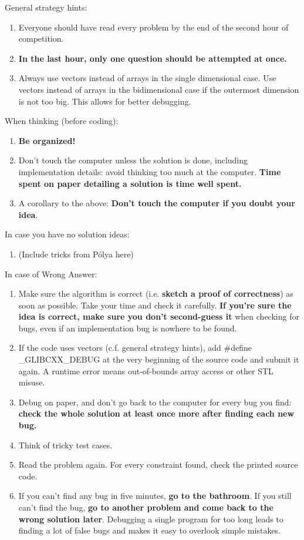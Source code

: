       General strategy hints:
      \begin{enumerate}
        \item Everyone should have read every problem by the end of the second hour of competition.
        \item \textbf{In the last hour, only one question should be attempted at once.}
        \item Always use vectors instead of arrays in the single dimensional case. Use vectors instead of arrays in the bidimensional case if the outermost dimension is not too big. This allows for better debugging.
      \end{enumerate}

      When thinking (before coding):
      \begin{enumerate}
        \item \textbf{Be organized!}
        \item Don't touch the computer unless the solution is done, including implementation details: avoid thinking too much at the computer. \textbf{Time spent on paper detailing a solution is time well spent.}
        \item A corollary to the above: \textbf{Don't touch the computer if you doubt your idea}.
      \end{enumerate}

      In case you have no solution ideas:
      \begin{enumerate}
        \item (Include tricks from Pólya here)
      \end{enumerate}

      In case of Wrong Answer:
      \begin{enumerate}
        \item Make sure the algorithm is correct (i.e. \textbf{sketch a proof of correctness}) as soon as possible. Take your time and check it carefully. \textbf{If you're sure the idea is correct, make sure you don't second-guess it} when checking for bugs, even if an implementation bug is nowhere to be found.
        \item If the code uses vectors (c.f. general strategy hints), add \#define \_GLIBCXX\_DEBUG at the very beginning of the source code and submit it again. A runtime error means out-of-bounds array access or other STL misuse.
        \item Debug on paper, and don't go back to the computer for every bug you find: \textbf{check the whole solution at least once more after finding each new bug.}
        \item Think of tricky test cases.
        \item Read the problem again. For every constraint found, check the printed source code.
        \item If you can't find any bug in five minutes, \textbf{go to the bathroom}. If you still can't find the bug, \textbf{go to another problem and come back to the wrong solution later}. Debugging a single program for too long leads to finding a lot of false bugs and makes it easy to overlook simple mistakes.
      \end{enumerate}

